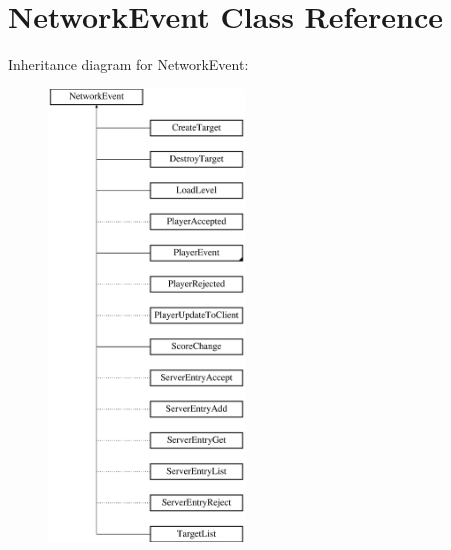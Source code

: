 \hypertarget{class_network_event}{\section{Network\-Event Class Reference}
\label{class_network_event}
}
Inheritance diagram for Network\-Event\-:\begin{figure}[H]
\begin{center}
\leavevmode
\includegraphics[height=12.000000cm]{class_network_event}
\end{center}
\end{figure}
